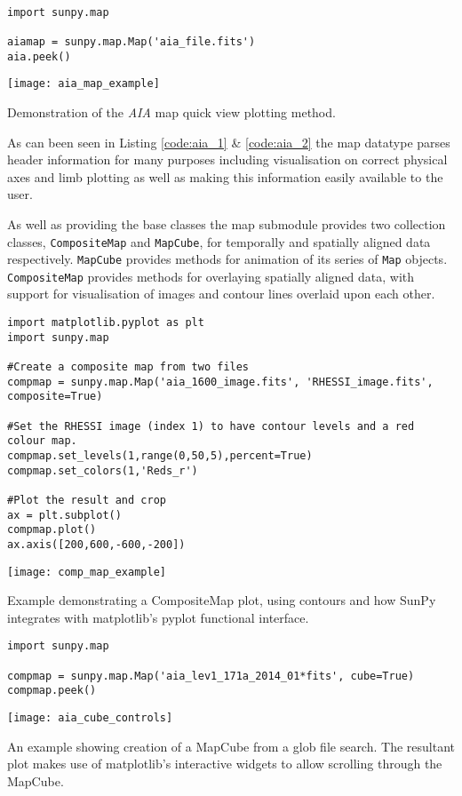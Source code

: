 \begin{listing}[h]
\begin{verbatim}

import sunpy.map

aiamap = sunpy.map.Map('aia_file.fits')
aia.peek()
\end{verbatim}
\texttt{[image: aia\_map\_example]}
\caption{Demonstration of the \textit{AIA} map quick view plotting method.}
\label{code:aia_1}
\end{listing}

As can been seen in Listing \ref{code:aia_1} \& \ref{code:aia_2} the map 
datatype parses header information for many purposes including visualisation on 
correct physical axes and limb plotting as well as making this information 
easily available to the user.

As well as providing the base classes the map submodule provides two 
collection classes, \texttt{CompositeMap} and \texttt{MapCube}, for 
temporally and spatially aligned data respectively. \texttt{MapCube} 
provides methods for animation of its series of \texttt{Map} objects. 
\texttt{CompositeMap} provides methods for overlaying spatially aligned 
data, with support for visualisation of images and contour lines overlaid 
upon each other.

\begin{listing}[h]
\begin{verbatim}
import matplotlib.pyplot as plt
import sunpy.map

#Create a composite map from two files
compmap = sunpy.map.Map('aia_1600_image.fits', 'RHESSI_image.fits', 
composite=True)

#Set the RHESSI image (index 1) to have contour levels and a red colour map.
compmap.set_levels(1,range(0,50,5),percent=True)
compmap.set_colors(1,'Reds_r')

#Plot the result and crop
ax = plt.subplot()
compmap.plot()
ax.axis([200,600,-600,-200])
\end{verbatim}
\texttt{[image: comp\_map\_example]}
\caption{Example demonstrating a CompositeMap plot, using contours and how 
SunPy integrates with matplotlib's pyplot functional interface.}
\label{code:compmap_1}
\end{listing}

\begin{listing}[h]
\begin{verbatim}
import sunpy.map

compmap = sunpy.map.Map('aia_lev1_171a_2014_01*fits', cube=True)
compmap.peek()
\end{verbatim}
\texttt{[image: aia\_cube\_controls]}
\caption{An example showing creation of a MapCube from a glob file search. The 
resultant plot makes use of matplotlib's interactive widgets to allow scrolling 
through the MapCube.}
\label{code:mapcube_1}
\end{listing}

